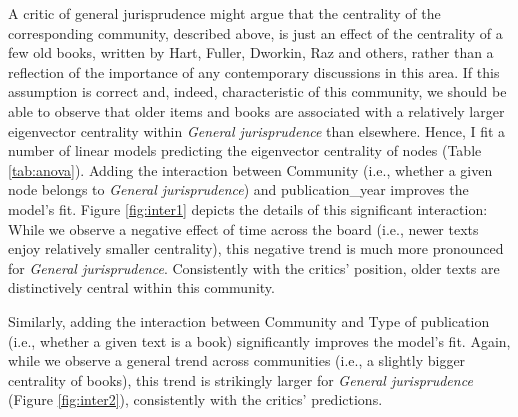 \documentclass[
]{article}
\begin{document}
A critic of general jurisprudence might argue that the centrality of the corresponding community, described above, is just an effect of the centrality of a few old books, written by Hart, Fuller, Dworkin, Raz and others, rather than a reflection of the importance of any contemporary discussions in this area. If this assumption is correct and, indeed, characteristic of this community, we should be able to observe that older items and books are associated with a relatively larger eigenvector centrality within \emph{General jurisprudence} than elsewhere. Hence, I fit a number of linear models predicting the eigenvector centrality of nodes (Table \ref{tab:anova}). Adding the interaction between Community (i.e., whether a given node belongs to \emph{General jurisprudence}) and publication\_year improves the model's fit. Figure \ref{fig:inter1} depicts the details of this significant interaction: While we observe a negative effect of time across the board (i.e., newer texts enjoy relatively smaller centrality), this negative trend is much more pronounced for \emph{General jurisprudence}. Consistently with the critics' position, older texts are distinctively central within this community.

Similarly, adding the interaction between Community and Type of publication (i.e., whether a given text is a book) significantly improves the model's fit. Again, while we observe a general trend across communities (i.e., a slightly bigger centrality of books), this trend is strikingly larger for \emph{General jurisprudence} (Figure \ref{fig:inter2}), consistently with the critics' predictions.
\end{document}
